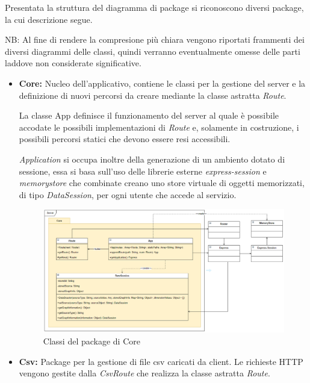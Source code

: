 \documentclass[../manuale_sviluppatore.tex]{subfiles}
\begin{document}
\par Presentata la struttura del diagramma di package si riconoscono diversi package, la cui descrizione segue.

NB: Al fine di rendere la compresione più chiara vengono riportati frammenti dei diversi diagrammi delle classi, 
quindi verranno eventualmente omesse delle parti laddove non considerate significative.
\newpage

\begin{itemize}
	
	\item \textbf{Core:} Nucleo dell'applicativo, contiene le classi per la gestione del server
	e la definizione di nuovi percorsi da creare mediante la classe astratta \emph{Route}. 
	
	La classe App definisce il funzionamento del server al quale è possibile accodate le 
	possibili implementazioni di \emph{Route} e, solamente in costruzione, i possibili 
	percorsi statici che devono essere resi accessibili. 
	
	\emph{Application} si occupa inoltre della generazione di un ambiento dotato di sessione, essa 
	si basa sull'uso delle librerie esterne \emph{express-session} e \emph{memorystore}
	che combinate creano uno store virtuale di oggetti memorizzati, di tipo \emph{DataSession}, per ogni 
	utente che accede al servizio.
		
	\begin{figure}[H]
		\centering
		\includegraphics[width=18cm]{img/server-core.png}
		\caption{Classi del package di Core}
	\end{figure}

	\newpage
	\item \textbf{Csv:} Package per la gestione di file csv caricati da client. 
	Le richieste HTTP vengono gestite dalla \emph{CsvRoute} che realizza la classe astratta \emph{Route}.
	

\end{itemize}
\end{document}
